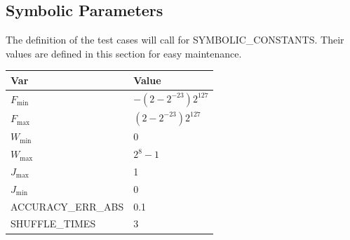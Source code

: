 \documentclass[12pt, titlepage]{article}
\begin{document}

\subsection{Symbolic Parameters}

The definition of the test cases will call for SYMBOLIC\_CONSTANTS.
Their values are defined in this section for easy maintenance.

\begin{table}[H]
\caption{Table of SYMBOLIC\_CONSTANTS} \label{Tabel:constants}
\renewcommand{\arraystretch}{1.2}
\noindent \begin{longtable*}{l l} 
  \toprule
  \textbf{Var} & \textbf{Value} \\
  \midrule 
  $F_{\min}$ & $-(2 -2^{-23})2^{127}$\\
  $F_{\max}$ & $(2-2^{-23})2^{127}$\\
    $W_{\min}$ & 0\\
  $W_{\max}$ &  $2^{8} - 1$\\
  $J_{\max}$ & 1\\
  $J_{\min}$ & 0\\
  ACCURACY\_ERR\_ABS & 0.1 \\
  SHUFFLE\_TIMES & 3 \\
  \bottomrule
\end{longtable*}
\end{table}


\end{document}

